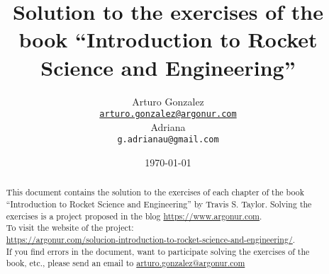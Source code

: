 \documentclass{article}
\begin{document}
\title{Solution to the exercises of the book ``Introduction to Rocket Science and Engineering''}
\author{Arturo Gonzalez\\
	\texttt{\href{mailto:arturo.gonzalez@argonur.com}{arturo.gonzalez@argonur.com}} \\
	Adriana \\
	\texttt{g.adrianau@gmail.com}}
\date{\today}
\maketitle

\begin{abstract}
This document contains the solution to the exercises of each chapter of the book ``Introduction to Rocket Science and Engineering'' by Travis S. Taylor. Solving the exercises is a project proposed in the blog \url{https://www.argonur.com}.\\

To visit the website of the project: \\
\url{https://argonur.com/solucion-introduction-to-rocket-science-and-engineering/}.\\

If you find errors in the document, want to participate solving the exercises of the book, etc., please send an email to \href{mailto:arturo.gonzalez@argonur.com}{arturo.gonzalez@argonur.com}
\end{abstract}

\cleardoublepage



\cleardoublepage

\graphicspath{{Chapter2/}}


\cleardoublepage
\end{document}
